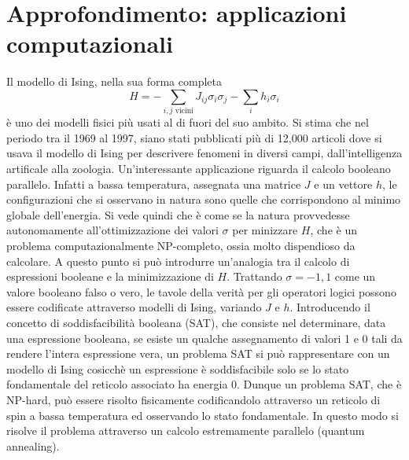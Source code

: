 \documentclass[Lau, noexaminfo, oneside]{sapthesis} %
\begin{document}
\section{Approfondimento: applicazioni computazionali}
Il modello di Ising, nella sua forma completa
\begin{equation}
H = - \sum_{i,j \text{ vicini}} J_{ij} \sigma_i \sigma_j - \sum_i h_i \sigma_i
\end{equation}
è uno dei modelli fisici più usati al di fuori del suo ambito. Si stima che nel periodo tra il 1969 al 1997, siano stati pubblicati più di 12,000 articoli dove si usava il modello di Ising per descrivere fenomeni in diversi campi, dall'intelligenza artificale alla zoologia. \cite{dwave}
Un'interessante applicazione riguarda il calcolo booleano parallelo. Infatti a bassa temperatura, assegnata una matrice $J$ e un vettore $h$, le configurazioni che si osservano in natura sono quelle che corrispondono al minimo globale dell'energia. Si vede quindi che è come se la natura provvedesse autonomamente all'ottimizzazione dei valori $\sigma$ per minizzare $H$, che è un problema computazionalmente NP-completo, ossia molto dispendioso da calcolare. A questo punto si può introdurre un'analogia tra il calcolo di espressioni booleane e la minimizzazione di $H$. Trattando $\sigma=-1, 1$ come un valore booleano falso o vero, le tavole della verità per gli operatori logici possono essere codificate attraverso modelli di Ising, variando $J$ e $h$. Introducendo il concetto di soddisfacibilità booleana (SAT), che consiste nel determinare, data una espressione booleana, se esiste un qualche assegnamento di valori 1 e 0 tali da rendere l'intera espressione vera, un problema SAT si può rappresentare con un modello di Ising cosicchè un espressione è soddisfacibile solo se lo stato fondamentale del reticolo associato ha energia 0. Dunque un problema SAT, che è NP-hard, può essere risolto fisicamente codificandolo attraverso un reticolo di spin a bassa temperatura ed osservando lo stato fondamentale. In questo modo si risolve il problema attraverso un calcolo estremamente parallelo (quantum annealing).\cite{quantumannealing}
\end{document}
